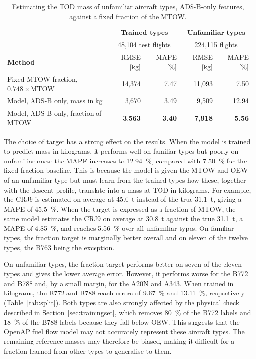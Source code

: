 \documentclass[
  manuscript=proceedings,  %
  layout=preprint,  %
  year=2026,
  volume=x,
]{extra/joas}
\begin{document}
\begin{table}[htbp]
    \centering
    \small
    \begin{tabular}{@{}lrrrr@{}}
    \toprule
    & \multicolumn{2}{c}{\textbf{Trained types}} & \multicolumn{2}{c}{\textbf{Unfamiliar types}} \\
    & \multicolumn{2}{c}{48{,}104 test flights} & \multicolumn{2}{c}{224{,}115 flights} \\
    \textbf{Method} & RMSE [kg] & MAPE [\%] & RMSE [kg] & MAPE [\%] \\
    \midrule
    Fixed MTOW fraction, $0.748 \times \text{MTOW}$ & 14{,}374 & 7.47 & 11{,}093 & 7.50 \\
    \addlinespace
    Model, ADS-B only, mass in kg & 3{,}670 & 3.49 & 9{,}509 & 12.94 \\
    Model, ADS-B only, fraction of MTOW & \textbf{3{,}563} & \textbf{3.40} & \textbf{7{,}918} & \textbf{5.56} \\
    \bottomrule
    \end{tabular}
    \caption{Estimating the TOD mass of unfamiliar aircraft types, ADS-B-only features, against a fixed fraction of the MTOW.}
    \label{tab:unseen}
\end{table}

The choice of target has a strong effect on the results. When the model is trained to predict mass in kilograms, it performs well on familiar types but poorly on unfamiliar ones: the MAPE increases to 12.94~\%, compared with 7.50~\% for the fixed-fraction baseline. This is because the model is given the MTOW and OEW of an unfamiliar type but must learn from the trained types how these, together with the descent profile, translate into a mass at TOD in kilograms. For example, the CRJ9 is estimated on average at 45.0~t instead of the true 31.1~t, giving a MAPE of 45.5~\%. When the target is expressed as a fraction of MTOW, the same model estimates the CRJ9 on average at 30.8~t against the true 31.1~t, a MAPE of 4.85~\%, and reaches 5.56~\% over all unfamiliar types. On familiar types, the fraction target is marginally better overall and on eleven of the twelve types, the B763 being the exception.

On unfamiliar types, the fraction target performs better on seven of the eleven types and gives the lower average error. However, it performs worse for the B772 and B788 and, by a small margin, for the A20N and A343. When trained in kilograms, the B772 and B788 reach errors of 9.67~\% and 13.11~\%, respectively (Table~\ref{tab:split}). Both types are also strongly affected by the physical check described in Section~\ref{sec:trainingset}, which removes 80~\% of the B772 labels and 18~\% of the B788 labels because they fall below OEW. This suggests that the OpenAP fuel flow model may not accurately represent these aircraft types. The remaining reference masses may therefore be biased, making it difficult for a fraction learned from other types to generalise to them.
\end{document}
